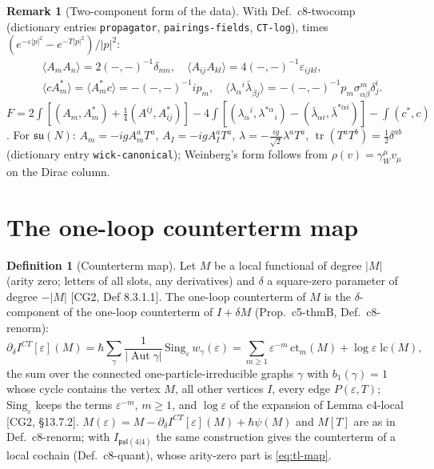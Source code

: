 \documentclass[11pt]{article}
\numberwithin{equation}{section}
\theoremstyle{plain}
\theoremstyle{definition}
\newtheorem{definition}[theorem]{Definition}
\newtheorem{remark}[theorem]{Remark}
\begin{document}
\begin{remark}[Two-component form of the data]
\label{rem:tl-twocomp0}
With Def.~c8-twocomp (dictionary entries \texttt{propagator}, \texttt{pairings-fields}, \texttt{CT-log}), times $(e^{-\varepsilon|p|^2}-e^{-T|p|^2})/|p|^2$:
\[
\begin{aligned}&\langle A_mA_n\rangle=2(-,-)^{-1}\delta_{mn},\quad \langle A_{ij}A_{kl}\rangle=4(-,-)^{-1}\varepsilon_{ijkl},\\ &\langle cA^*_m\rangle=\langle A^*_mc\rangle=-(-,-)^{-1}ip_m,\quad \langle\lambda_\alpha{}^i\bar\lambda_{\dot\beta j}\rangle=-(-,-)^{-1}p_m\sigma^m_{\alpha\dot\beta}\delta^i_j .\end{aligned}
\]
$F=2\int[(A_m,A^*_m)+\tfrac14(A^{ij},A^*_{ij})]-4\int[(\lambda_\alpha{}^i,\lambda^{*\alpha}{}_i)-(\bar\lambda_{\dot\alpha i},\bar\lambda^{*\dot\alpha i})]-\int(c^*,c)$. For $\mathfrak{su}(N)$: $A_m=-igA_m^aT^a$, $A_I=-igA_I^aT^a$, $\lambda=-\tfrac{ig}{\sqrt2}\lambda^aT^a$, $\operatorname{tr}(T^aT^b)=\tfrac12\delta^{ab}$ (dictionary entry \texttt{wick-canonical}); Weinberg's form follows from $\rho(v)=\gamma_W^\mu v_\mu$ on the Dirac column.
\end{remark}


\section{The one-loop counterterm map}
\label{sec:tl-map}

\begin{definition}[Counterterm map]
\label{def:tl-map}
Let $M$ be a local functional of degree $|M|$ (arity zero; letters of all slots, any derivatives) and $\delta$ a square-zero parameter of degree $-|M|$ [CG2, Def 8.3.1.1]. The one-loop counterterm of $M$ is the $\delta$-component of the one-loop counterterm of $I+\delta M$ (Prop.~c5-thmB, Def.~c8-renorm):
\begin{equation}
\partial_\delta I^{CT}[\varepsilon](M)=\hbar\sum_{\gamma}\frac{1}{|\operatorname{Aut}\gamma|}\,\mathrm{Sing}_\varepsilon\,w_\gamma(\varepsilon)=\sum_{m\ge1}\varepsilon^{-m}\,\mathrm{ct}_m(M)+\log\varepsilon\;\mathrm{lc}(M),
\label{eq:tl-map}
\end{equation}
the sum over the connected one-particle-irreducible graphs $\gamma$ with $b_1(\gamma)=1$ whose cycle contains the vertex $M$, all other vertices $I$, every edge $P(\varepsilon,T)$; $\mathrm{Sing}_\varepsilon$ keeps the terms $\varepsilon^{-m}$, $m\ge1$, and $\log\varepsilon$ of the expansion of Lemma c4-local [CG2, §13.7.2]. $M(\varepsilon)=M-\partial_\delta I^{CT}[\varepsilon](M)+\hbar\psi(M)$ and $M[T]$ are as in Def.~c8-renorm; with $I_{\mathfrak{psl}(4|4)}$ the same construction gives the counterterm of a local cochain (Def.~c8-quant), whose arity-zero part is \eqref{eq:tl-map}.
\end{definition}
\end{document}
